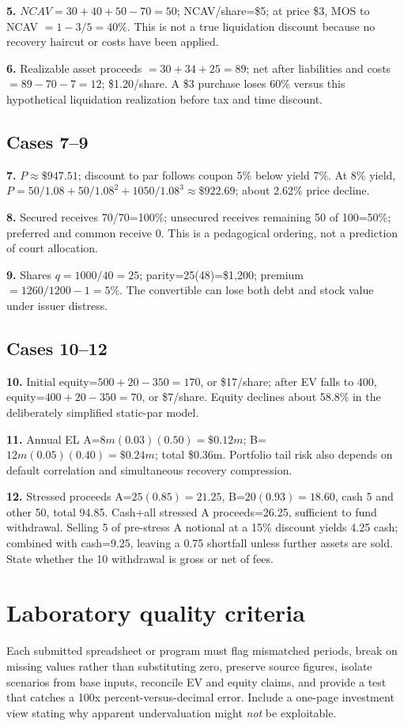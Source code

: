 \documentclass[11pt,letterpaper]{article}
\begin{document}
\textbf{5.} $NCAV=30+40+50-70=50$; NCAV/share=\$5; at price \$3, MOS to NCAV $=1-3/5=40\%$. This is not a true liquidation discount because no recovery haircut or costs have been applied.

\textbf{6.} Realizable asset proceeds $=30+34+25=89$; net after liabilities and costs $=89-70-7=12$; \$1.20/share. A \$3 purchase loses 60\% versus this hypothetical liquidation realization before tax and time discount.

\subsection{Cases 7--9}
\textbf{7.} $P\approx\$947.51$; discount to par follows coupon 5\% below yield 7\%. At 8\% yield, $P=50/1.08+50/1.08^2+1050/1.08^3\approx\$922.69$; about 2.62\% price decline.

\textbf{8.} Secured receives 70/70=100\%; unsecured receives remaining 50 of 100=50\%; preferred and common receive 0. This is a pedagogical ordering, not a prediction of court allocation.

\textbf{9.} Shares $q=1000/40=25$; parity=25(48)=\$1,200; premium $=1260/1200-1=5\%$. The convertible can lose both debt and stock value under issuer distress.

\subsection{Cases 10--12}
\textbf{10.} Initial equity=$500+20-350=170$, or \$17/share; after EV falls to 400, equity=$400+20-350=70$, or \$7/share. Equity declines about 58.8\% in the deliberately simplified static-par model.

\textbf{11.} Annual EL A=$8m(0.03)(0.50)=\$0.12m$; B=$12m(0.05)(0.40)=\$0.24m$; total \$0.36m. Portfolio tail risk also depends on default correlation and simultaneous recovery compression.

\textbf{12.} Stressed proceeds A=$25(0.85)=21.25$, B=$20(0.93)=18.60$, cash 5 and other 50, total 94.85. Cash+all stressed A proceeds=26.25, sufficient to fund withdrawal. Selling 5 of pre-stress A notional at a 15\% discount yields 4.25 cash; combined with cash=9.25, leaving a 0.75 shortfall unless further assets are sold. State whether the 10 withdrawal is gross or net of fees.

\section{Laboratory quality criteria}
Each submitted spreadsheet or program must flag mismatched periods, break on missing values rather than substituting zero, preserve source figures, isolate scenarios from base inputs, reconcile EV and equity claims, and provide a test that catches a 100x percent-versus-decimal error. Include a one-page investment view stating why apparent undervaluation might \emph{not} be exploitable.
\end{document}

